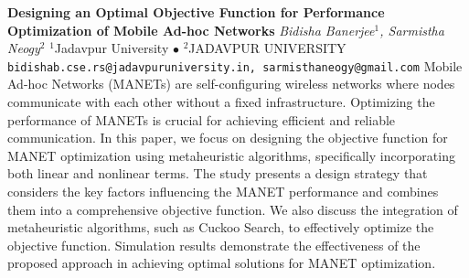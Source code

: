 
    \begin{conf-abstract}[]
        {\textbf{Designing an Optimal Objective Function for Performance Optimization of Mobile Ad-hoc Networks}}
        {\textit{Bidisha  Banerjee$^{1}$, Sarmistha Neogy$^{2}$}}
        {$^{1}$Jadavpur University $\bullet$ $^{2}$JADAVPUR UNIVERSITY}
        {\texttt{bidishab.cse.rs@jadavpuruniversity.in, sarmisthaneogy@gmail.com}}
        {Mobile Ad-hoc Networks (MANETs) are self-configuring wireless networks where nodes communicate with each other without a fixed infrastructure. Optimizing the performance of MANETs is crucial for achieving efficient and reliable communication. In this paper, we focus on designing the objective function for MANET optimization using metaheuristic algorithms, specifically incorporating both linear and nonlinear terms. The study presents a design strategy that considers the key factors influencing the MANET performance and combines them into a comprehensive objective function. We also discuss the integration of metaheuristic algorithms, such as Cuckoo Search, to effectively optimize the objective function. Simulation results demonstrate the effectiveness of the proposed approach in achieving optimal solutions for MANET optimization.}
    \end{conf-abstract}
        